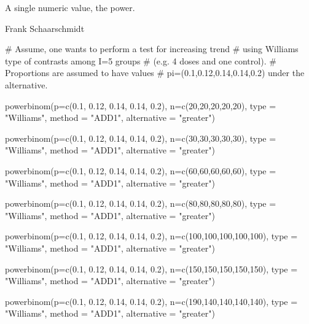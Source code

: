 \begin{Value}
A single numeric value, the power.
\end{Value}
\begin{Note}\relax
\end{Note}
\begin{Author}\relax
Frank Schaarschmidt
\end{Author}
\begin{References}\relax
\end{References}
\begin{SeeAlso}\relax
{}
\end{SeeAlso}
\begin{Examples}
\begin{ExampleCode}

# Assume, one wants to perform a test for increasing trend
#  using Williams type of contrasts among I=5 groups
#  (e.g. 4 doses and one control).
#  Proportions are assumed to have values
#  pi=(0.1,0.12,0.14,0.14,0.2) under the alternative.


powerbinom(p=c(0.1, 0.12, 0.14, 0.14, 0.2),
 n=c(20,20,20,20,20), type = "Williams",
  method = "ADD1", alternative = "greater")

powerbinom(p=c(0.1, 0.12, 0.14, 0.14, 0.2),
 n=c(30,30,30,30,30), type = "Williams",
  method = "ADD1", alternative = "greater")

powerbinom(p=c(0.1, 0.12, 0.14, 0.14, 0.2),
 n=c(60,60,60,60,60), type = "Williams",
  method = "ADD1", alternative = "greater")

powerbinom(p=c(0.1, 0.12, 0.14, 0.14, 0.2),
 n=c(80,80,80,80,80), type = "Williams",
  method = "ADD1", alternative = "greater")

powerbinom(p=c(0.1, 0.12, 0.14, 0.14, 0.2),
 n=c(100,100,100,100,100), type = "Williams",
  method = "ADD1", alternative = "greater")

powerbinom(p=c(0.1, 0.12, 0.14, 0.14, 0.2),
 n=c(150,150,150,150,150), type = "Williams",
  method = "ADD1", alternative = "greater")

powerbinom(p=c(0.1, 0.12, 0.14, 0.14, 0.2),
 n=c(190,140,140,140,140), type = "Williams",
  method = "ADD1", alternative = "greater")

\end{ExampleCode}
\end{Examples}


